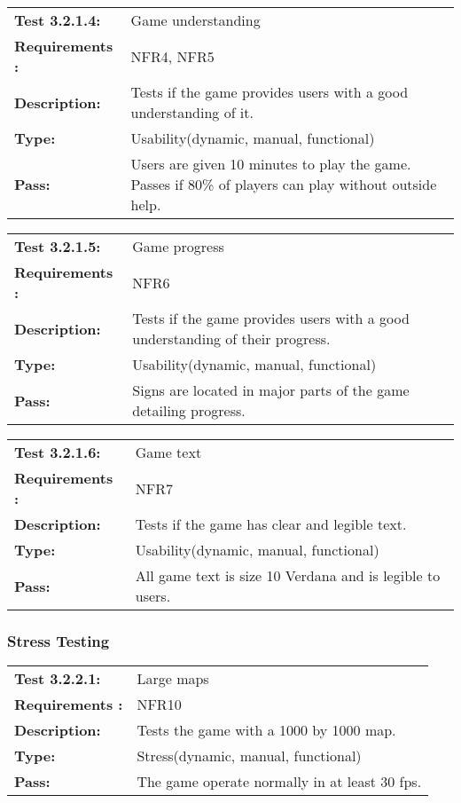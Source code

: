 \documentclass[12pt, titlepage]{article}
\begin{document}
\begin{tabular}{|l|p{10cm}|}
    \hline
    \bf{Test} 3.2.1.4: & Game understanding \\
    \bf{Requirements} : & NFR4, NFR5 \\
    \bf{Description}: & Tests if the game provides users with a good understanding of it. \\
    \bf{Type}: & Usability(dynamic, manual, functional) \\
    \bf{Pass}: & Users are given 10 minutes to play the game. Passes if 80\% of players can play without outside help. \\
    \hline
\end{tabular}

\begin{tabular}{|l|p{10cm}|}
    \hline
    \bf{Test} 3.2.1.5: & Game progress \\
    \bf{Requirements} : & NFR6 \\
    \bf{Description}: & Tests if the game provides users with a good understanding of their progress. \\
    \bf{Type}: & Usability(dynamic, manual, functional) \\
    \bf{Pass}: & Signs are located in major parts of the game detailing progress. \\
    \hline
\end{tabular}

\begin{tabular}{|l|p{10cm}|}
    \hline
    \bf{Test} 3.2.1.6: & Game text \\
    \bf{Requirements} : & NFR7 \\
    \bf{Description}: & Tests if the game has clear and legible text. \\
    \bf{Type}: & Usability(dynamic, manual, functional) \\
    \bf{Pass}: & All game text is size 10 Verdana and is legible to users. \\
    \hline
\end{tabular}

\subsubsection{Stress Testing}

\begin{tabular}{|l|p{10cm}|}
    \hline
    \bf{Test} 3.2.2.1: & Large maps \\
    \bf{Requirements} : & NFR10 \\
    \bf{Description}: & Tests the game with a 1000 by 1000 map. \\
    \bf{Type}: & Stress(dynamic, manual, functional) \\
    \bf{Pass}: & The game operate normally in at least 30 fps. \\
    \hline
\end{tabular}
\end{document}
